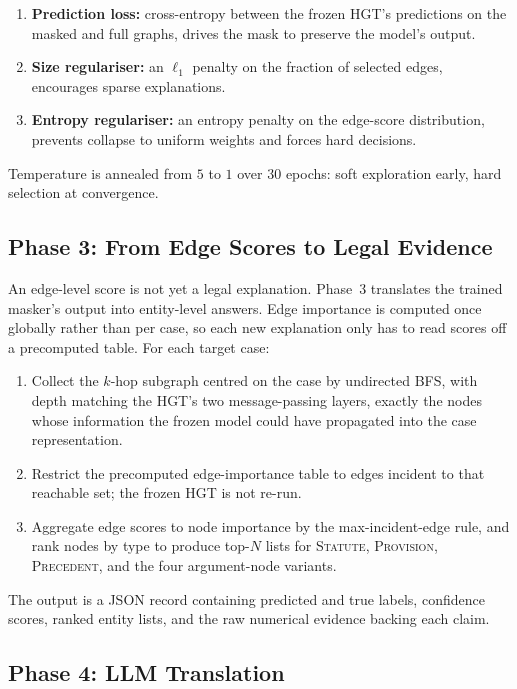 \begin{enumerate}
  \item \textbf{Prediction loss:} cross-entropy between the frozen
    HGT's predictions on the masked and full graphs, drives the
    mask to preserve the model's output.
  \item \textbf{Size regulariser:} an $\ell_1$ penalty on the
    fraction of selected edges, encourages sparse explanations.
  \item \textbf{Entropy regulariser:} an entropy penalty on the
    edge-score distribution, prevents collapse to uniform weights
    and forces hard decisions.
\end{enumerate}

Temperature is annealed from $5$ to $1$ over $30$ epochs: soft
exploration early, hard selection at convergence.

\subsection{Phase 3: From Edge Scores to Legal Evidence}

An edge-level score is not yet a legal explanation. Phase~3
translates the trained masker's output into entity-level answers.
Edge importance is computed once globally rather than per case, so
each new explanation only has to read scores off a precomputed
table. For each target case:

\begin{enumerate}
  \item Collect the $k$-hop subgraph centred on the case by
    undirected BFS, with depth matching the HGT's two
    message-passing layers, exactly the nodes whose information
    the frozen model could have propagated into the case
    representation.
  \item Restrict the precomputed edge-importance table to edges
    incident to that reachable set; the frozen HGT is not re-run.
  \item Aggregate edge scores to node importance by the
    max-incident-edge rule, and rank nodes by type to produce
    top-$N$ lists for \textsc{Statute}, \textsc{Provision},
    \textsc{Precedent}, and the four argument-node variants.
\end{enumerate}

The output is a JSON record containing predicted and true labels,
confidence scores, ranked entity lists, and the raw numerical
evidence backing each claim.

\subsection{Phase 4: LLM Translation}

